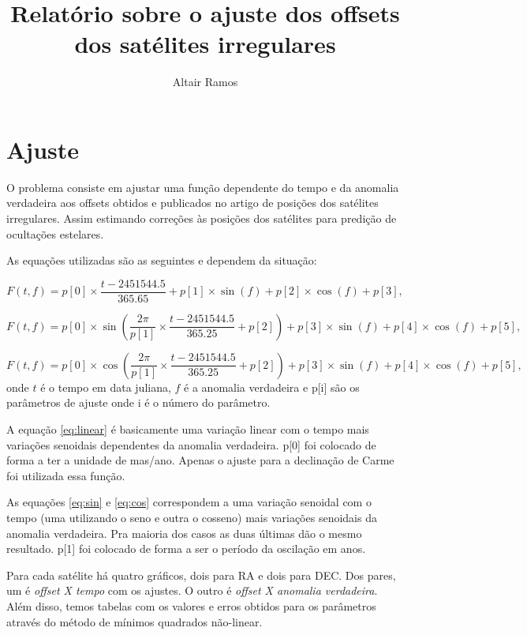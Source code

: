 \documentclass[11pt,a4paper]{report}
\title{Relatório sobre o ajuste dos offsets dos satélites irregulares}
\author{Altair Ramos}
\begin{document}
\maketitle

\chapter*{Ajuste}

\indent \indent O problema consiste em ajustar uma função dependente do tempo e da anomalia verdadeira aos offsets obtidos e publicados no artigo de posições dos satélites irregulares. Assim estimando correções às posições dos satélites para predição de ocultações estelares.

As equações utilizadas são as seguintes e dependem da situação:

\begin{equation}
F(t,f) = p[0]\times \frac{t - 2451544.5}{365.65} + p[1]\times \sin(f) + p[2]\times\cos(f) + p[3],
\label{eq:linear}
\end{equation}

\begin{equation}
F(t,f) = p[0]\times\sin\left(\frac{2\pi}{p[1]}\times \frac{t - 2451544.5}{365.25} + p[2]\right) + p[3]\times\sin(f) + p[4]\times\cos(f) + p[5],
\label{eq:sin}
\end{equation}

\begin{equation}
F(t,f) = p[0]\times\cos\left(\frac{2\pi}{p[1]}\times \frac{t - 2451544.5}{365.25} + p[2]\right) + p[3]\times\sin(f) + p[4]\times\cos(f) + p[5],
\label{eq:cos}
\end{equation}
onde $t$ é o tempo em data juliana, $f$ é a anomalia verdadeira e p[i] são os parâmetros de ajuste onde i é o número do parâmetro.

A equação \ref{eq:linear} é basicamente uma variação linear com o tempo mais variações senoidais dependentes da anomalia verdadeira. p[0] foi colocado de forma a ter a unidade de mas/ano. Apenas o ajuste para a declinação de Carme foi utilizada essa função.

As equaç\~oes \ref{eq:sin} e \ref{eq:cos} correspondem a uma variação senoidal com o tempo (uma utilizando o seno e outra o cosseno) mais variações senoidais da anomalia verdadeira. Pra maioria dos casos as duas últimas dão o mesmo resultado. p[1] foi colocado de forma a ser o período da oscilação em anos.

Para cada satélite há quatro gráficos, dois para RA e dois para DEC. Dos pares, um é \textit{offset X tempo} com os ajustes. O outro é \textit{offset X anomalia verdadeira}. Além disso, temos tabelas com os valores e erros obtidos para os parâmetros através do método de mínimos quadrados não-linear.
\end{document}
